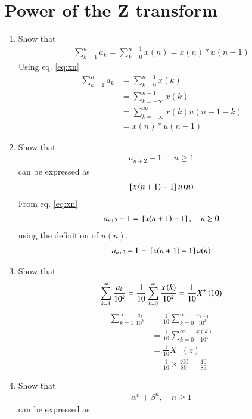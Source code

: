 \documentclass[journal,12pt,twocolumn]{IEEEtran}
\renewcommand\thesection{\arabic{section}}
\begin{document}
\section{Power of the Z transform}
\begin{enumerate}[label=\thesection.\arabic*,ref=\thesection.\theenumi]
\item Show that 
\begin{align}
	\sum_{k=1}^{n}a_k = 
	\sum_{k=0}^{n-1}x(n) = x(n)*u(n-1)
\end{align}
\solution Using eq. \ref{eq:xn}
\begin{align}
\sum_{k=1}^{n}a_k &= \sum_{k=0}^{n-1}x(k)\\ &= \sum_{k = -\infty}^{n - 1}x(k) \\ &= \sum_{k = -\infty}^{\infty}x(k)u(n - 1 - k)\\ &= x(n)*u(n - 1)
\end{align}
\item Show that 
\begin{align}
a_{n+2}-1, \quad n \ge 1
\end{align}
can be expressed as 
\begin{align}
	{}\left[x\left(n+1\right)-1\right]u\left(n\right)
\end{align}
\solution From eq. \ref{eq:xn}
\begin{align}
a_{n+2} - 1 = {}\left[x(n + 1) - 1\right], \quad n \ge 0
\end{align}
using the definition of $u(n)$,
\begin{align}
a_{n+2} - 1 = {}\left[x(n + 1) - 1\right]u(n)
\end{align}
 \item Show that 
\begin{align}
	\sum_{k=1}^{\infty}\frac{a_k}{10^k}= 
	\frac{1}{10}\sum_{k=0}^{\infty}\frac{x\left(k\right)}{10^k} =\frac{1}{10}X^{+}\left({10}\right)
\end{align}
\solution 
\begin{align}
\sum_{k=1}^{\infty}\frac{a_k}{10^k} &= \frac{1}{10}\sum_{k = 0}^{\infty}\frac{a_{k+1}}{10^k}\\ &= \frac{1}{10}\sum_{k = 0}^{\infty}\frac{x(k)}{10^k}\\ &= \frac{1}{10}X^+(z) \\ &= \frac{1}{10}\times\frac{100}{89} = \frac{10}{89}
\end{align}
\item Show that 
\begin{align}
\alpha^n + \beta^n, \quad n \ge 1
\end{align}
can be expressed as 

\end{enumerate}
\end{document}
